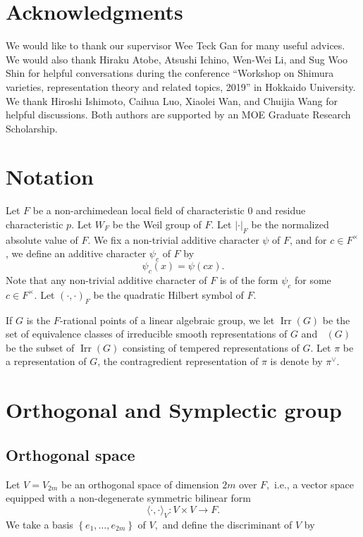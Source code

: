 \documentclass[article]{article}
\numberwithin{equation}{section}
\theoremstyle{definition}
\DeclareMathOperator{\Irr}{Irr}
\DeclareMathOperator{\Irrt}{Irr_{temp}}
\begin{document}
\section*{Acknowledgments} 
We would like to thank our supervisor Wee Teck Gan for many useful advices. We would also thank Hiraku Atobe, Atsushi Ichino, Wen-Wei Li, and Sug Woo Shin for helpful conversations during the conference ``Workshop on Shimura varieties, representation theory and related topics, 2019'' in Hokkaido University. We thank Hiroshi Ishimoto, Caihua Luo, Xiaolei Wan, and Chuijia Wang for helpful discussions. Both authors are supported by an MOE Graduate Research Scholarship. 
\section*{Notation}
Let $F$ be a non-archimedean local field of characteristic 0 and residue characteristic $p$. Let $W_F$ be the Weil group of $F$. Let $|\cdot|_F$ be the normalized absolute value of $F$. We fix a non-trivial additive character $\psi$ of $F$, and for $c\in F^{\times}$, we define an additive character $\psi_{c}$ of $F$ by 
$$\psi_{c}(x)=\psi(cx).$$ Note that any non-trivial additive character of $F$ is of the form $\psi_c$ for some $c\in F^{\times}$. Let $(\cdot,\cdot)_F$ be the quadratic Hilbert symbol of $F$. 

If $G$ is the $F$-rational points of a linear algebraic group, we let $\Irr(G)$ be the set of equivalence classes of irreducible smooth representations of $G$ and $\Irrt(G)$ be the subset of $\Irr(G)$ consisting of tempered representations of $G$. Let $\pi$ be a representation of $G$, the contragredient representation of $\pi$ is denote by $\pi^\vee$. 



\section{Orthogonal and Symplectic group}
\subsection{Orthogonal space}
Let $V=V_{2m}$ be an orthogonal space of dimension $2m$ over $F,$ i.e., a vector space equipped with a non-degenerate symmetric bilinear form 
$$\langle\cdot, \cdot\rangle_{V} : V \times V \rightarrow F.$$
We take a basis $\left\{e_{1}, \ldots, e_{2m}\right\}$ of $V,$ and define the discriminant of $V$ by
\end{document}
